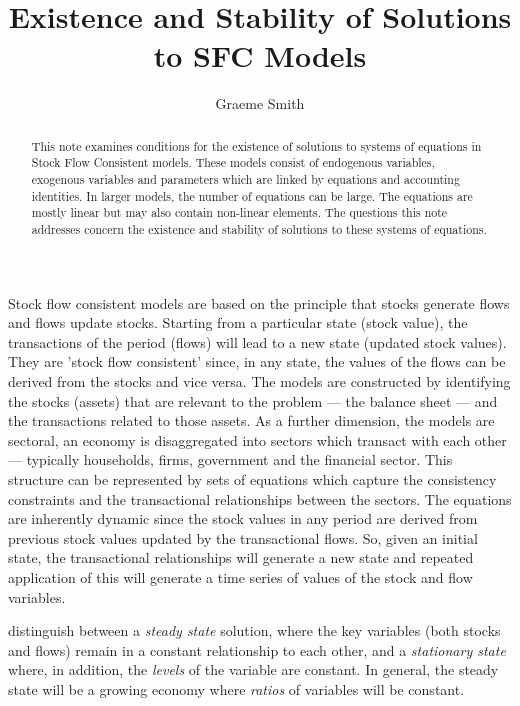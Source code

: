 \documentclass[twoside,a4paper,11pt]{article}
\title{Existence and Stability of Solutions to SFC Models}
\author{Graeme Smith}
\begin{document}
\maketitle
\begin{abstract} This note examines conditions for the existence of solutions to systems of equations in Stock Flow Consistent models. These models consist of endogenous variables, exogenous variables and parameters which are linked by equations and accounting  identities. In larger models, the number of equations can be large. The equations are mostly linear but may also contain non-linear elements. The questions this note addresses concern the existence and stability of solutions to these systems of equations. 
\end{abstract}

Stock flow consistent models are based on the principle that stocks generate flows and flows update stocks. Starting from a particular state (stock value), the transactions of the period (flows) will lead to a new state (updated stock values). They are 'stock flow consistent' since, in any state, the values of the flows can be derived from the stocks and vice versa. The models are constructed by identifying the stocks (assets) that are relevant to the problem --- the balance sheet --- and the transactions related to those assets. As a further dimension, the models are sectoral, an economy is disaggregated into sectors which transact with each other --- typically households, firms, government and the financial sector. This structure can be represented by sets of equations which capture the consistency constraints and the transactional relationships between the sectors. The equations are inherently dynamic since the stock values in any period are derived from previous stock values updated by the transactional flows. So, given an initial state, the transactional relationships will generate a new state and repeated application of this will generate a time series of values of the stock and flow variables.

\cite[pg.~71]{godleylavoie:2007} distinguish between a \emph{steady state} solution, where the key variables (both stocks and flows) remain in a constant relationship to each other, and a \emph{stationary state} where, in addition, the \emph{levels} of the variable are constant. In general, the steady state will be a growing economy where \emph{ratios} of variables will be constant.
\end{document}
